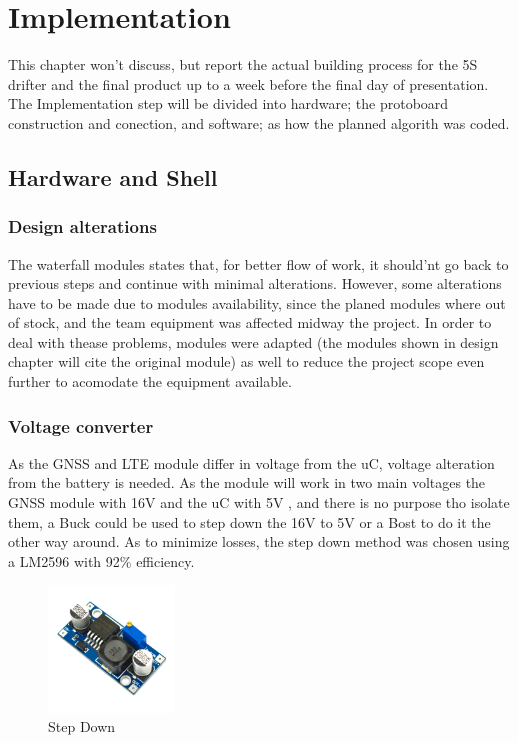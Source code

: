 \chapter{Implementation}
This chapter won't discuss, but report the actual building process for the 5S drifter and the final product 
up to a week before the final day of presentation. The Implementation step will be divided into hardware;
the protoboard construction and conection, and software; as how the planned algorith was coded.
\section{Hardware and Shell}

\subsection{Design alterations}

The waterfall modules states that, for better flow of work, it should'nt go back to previous steps 
and continue with minimal alterations. However, some alterations have to be made due to modules 
availability, since the planed modules where out of stock, and the team equipment was affected midway
the project. In order to deal with thease problems, modules were adapted (the modules shown in design 
chapter will cite the original module) as well to reduce the project scope even further to acomodate
the equipment available.  

\subsection{Voltage converter}

As the GNSS and LTE module differ in voltage from the uC, voltage alteration from the battery is needed.
As the module will work in two main voltages the GNSS module with 16V and the uC with 5V
, and there is no purpose tho isolate them, a Buck could be used to step down the 16V to 5V or a Bost to do 
it the other way around. As to minimize losses, the step down method was chosen using a LM2596 with 92\% 
efficiency.

\begin{figure}[H]
    \centering
    \includegraphics[width=0.3\textwidth]{images/chapter/implementation/step-sown.jpg}  %
    \caption{Step Down}
    \label{fig:Step Down}        
\end{figure}


